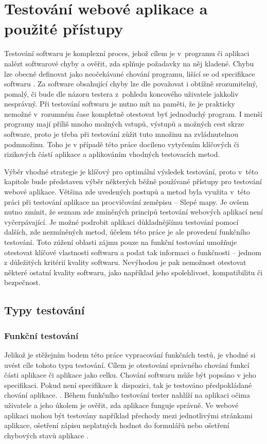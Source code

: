 \documentclass[
    color,   %
	table,   %
    twoside, %
]{fithesis3}
\begin{document}
\raggedbottom
\chapter{Testování webové aplikace a použité přístupy}
Testování softwaru je komplexní proces, jehož cílem je v~programu či aplikaci nalézt softwarové chyby a ověřit, zda splňuje požadavky na něj kladené. Chybu lze obecně definovat jako neočekávané chování programu, lišící se od specifikace softwaru \cite{SoftwareISTQB}. Za software obsahující chyby lze dle \cite{Patton} považovat i obtížně srozumitelný, pomalý, či bude dle názoru testera z~pohledu koncového uživatele jakkoliv nesprávný. Při testování softwaru je nutno mít na paměti, že je prakticky nemožné v~rozumném čase kompletně otestovat byť jednoduchý program.  I menší programy mají příliš mnoho možných vstupů, výstupů a možných cest skrze software, proto je třeba při testování zůžit tuto množinu na zvládnutelnou podmnožinu. Toho je v případě této práce docíleno vytyčením klíčových či rizikových částí aplikace a aplikováním vhodných testovacích metod.

Výběr vhodné strategie je klíčový pro optimální výsledek testování, proto v~této kapitole bude představen výběr některých běžně používané přístupy pro testování webové aplikace. Většina zde uvedených postupů a metod byla využita v~této práci při testování aplikace na procvičování zeměpisu – Slepé mapy. Je ovšem nutno zmínit, že seznam zde zmíněných principů testování webových aplikací není vyčerpávající. Je možné podrobit aplikaci důkladnějšímu testování pomocí dalších, zde nezmíněných metod, účelem této práce je ale provedení funkčního testování. Toto zúžení oblasti zájmu pouze na funkční testování umožňuje otestovat klíčové  vlastnosti softwaru a podat tak informaci o funkčnosti – jednom z důležitých kritérií kvality softwaru. Nevýhodou je pak nemožnost otestovat některé ostatní kvality softwaru, jako například jeho spolehlivost, kompatibilitu či bezpečnost.

\section{Typy testování}
\subsection{Funkční testování}
Jelikož je stěžejním bodem této práce vypracování funkčních testů, je vhodné si uvést cíle tohoto typu testování. Cílem je otestování správného chování funkcí části aplikace či aplikace jako celku. Chování softwaru může být popsáno v jeho specifikaci. Pokud není specifikace k~dispozici, tak je testováno předpokládané chování aplikace. \cite{FunctionalISTQB}. Během funkčního testování tester nahlíží na aplikaci očima uživatele a jeho úkolem je ověřit, zda aplikace funguje správně. Ve webové aplikaci mohou být testovány například přechody mezi jednotlivými stránkami aplikace, ošetření zápisu neplatných hodnot do formulářů nebo ošetření chybových stavů aplikace \cite{Patton}.
\end{document}
